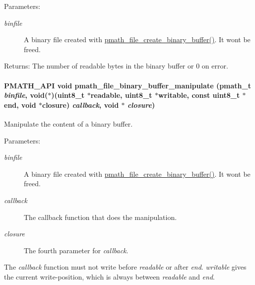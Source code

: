 \begin{Desc}
\item[Parameters:]
\begin{description}
\item[{\em binfile}]A binary file created with \hyperlink{group__file__api_g811d829fe964ebbe554c645a0f0f519d}{pmath\_\-file\_\-create\_\-binary\_\-buffer()}. It wont be freed. \end{description}
\end{Desc}
\begin{Desc}
\item[Returns:]The number of readable bytes in the binary buffer or 0 on error. \end{Desc}
\hypertarget{group__file__api_g9c684b801f150b0485c850cf3649cb16}{
\paragraph[{pmath\_\-file\_\-binary\_\-buffer\_\-manipulate}]{\setlength{\rightskip}{0pt plus 5cm}PMATH\_\-API void pmath\_\-file\_\-binary\_\-buffer\_\-manipulate ({\bf pmath\_\-t} {\em binfile}, \/  void($\ast$)(uint8\_\-t $\ast$readable, uint8\_\-t $\ast$writable, const uint8\_\-t $\ast$end, void $\ast$closure) {\em callback}, \/  void $\ast$ {\em closure})}\hfill}
\label{group__file__api_g9c684b801f150b0485c850cf3649cb16}


Manipulate the content of a binary buffer. 

\begin{Desc}
\item[Parameters:]
\begin{description}
\item[{\em binfile}]A binary file created with \hyperlink{group__file__api_g811d829fe964ebbe554c645a0f0f519d}{pmath\_\-file\_\-create\_\-binary\_\-buffer()}. It wont be freed. \item[{\em callback}]The callback function that does the manipulation. \item[{\em closure}]The fourth parameter for {\em callback\/}.\end{description}
\end{Desc}
The {\em callback\/} function must not write before {\em readable\/} or after {\em end\/}. {\em writable\/} gives the current write-position, which is always between {\em readable\/} and {\em end\/}. 